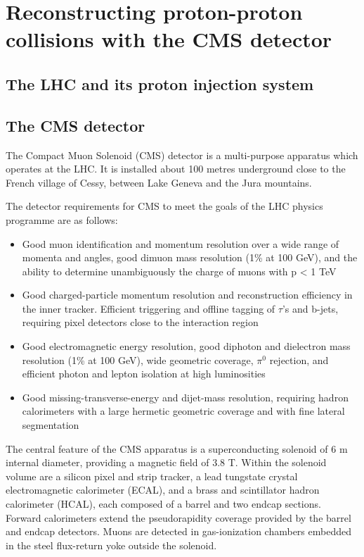 \chapter{Reconstructing proton-proton collisions with the CMS detector}
\section{The LHC and its proton injection system}
\section{The CMS detector}
The Compact Muon Solenoid (CMS) detector is a multi-purpose apparatus which operates at the LHC. 
It is installed about 100 metres underground close to the French village of Cessy, between
Lake Geneva and the Jura mountains.

The detector requirements for CMS to meet the goals of the LHC physics programme are as follows:
\begin{itemize}
\item Good muon identification and momentum resolution over a wide range of momenta and
angles, good dimuon mass resolution (1\% at 100 GeV), and the ability to determine unambiguously
the charge of muons with p < 1 TeV
\item Good charged-particle momentum resolution and reconstruction efficiency in the inner
tracker. Efficient triggering and offline tagging of $\tau$'s and b-jets, requiring pixel detectors
close to the interaction region
\item Good electromagnetic energy resolution, good diphoton and dielectron mass resolution (1\% at 100 GeV),
wide geometric coverage, ${\pi}^{0}$ rejection, and efficient photon and lepton
isolation at high luminosities
\item Good missing-transverse-energy and dijet-mass resolution, requiring hadron calorimeters
with a large hermetic geometric coverage and with fine lateral segmentation
\end{itemize}

The central feature of the CMS apparatus is a superconducting solenoid of 6 m internal diameter, providing a magnetic field of 3.8 T.
Within the solenoid volume are a silicon pixel and strip tracker, a lead tungstate crystal electromagnetic calorimeter (ECAL), and a brass and scintillator hadron calorimeter (HCAL), each composed of a barrel and two endcap sections. 
Forward calorimeters extend the pseudorapidity coverage provided by the barrel and endcap detectors. 
Muons are detected in gas-ionization chambers embedded in the steel flux-return yoke outside the solenoid.

